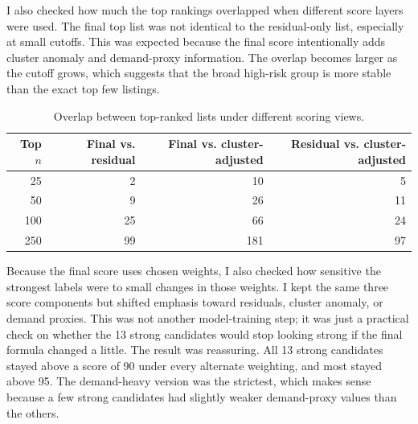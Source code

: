\documentclass[11pt]{article}
\begin{document}
I also checked how much the top rankings overlapped when different score layers were used. The final top list was not identical to the residual-only list, especially at small cutoffs. This was expected because the final score intentionally adds cluster anomaly and demand-proxy information. The overlap becomes larger as the cutoff grows, which suggests that the broad high-risk group is more stable than the exact top few listings.

\begin{table}[H]
\centering
\caption{Overlap between top-ranked lists under different scoring views.}
\small
\begin{tabular}{rrrr}
\toprule
Top $n$ & Final vs. residual & Final vs. cluster-adjusted & Residual vs. cluster-adjusted \\
\midrule
25 & 2 & 10 & 5 \\
50 & 9 & 26 & 11 \\
100 & 25 & 66 & 24 \\
250 & 99 & 181 & 97 \\
\bottomrule
\end{tabular}
\end{table}

Because the final score uses chosen weights, I also checked how sensitive the strongest labels were to small changes in those weights. I kept the same three score components but shifted emphasis toward residuals, cluster anomaly, or demand proxies. This was not another model-training step; it was just a practical check on whether the 13 strong candidates would stop looking strong if the final formula changed a little. The result was reassuring. All 13 strong candidates stayed above a score of 90 under every alternate weighting, and most stayed above 95. The demand-heavy version was the strictest, which makes sense because a few strong candidates had slightly weaker demand-proxy values than the others.

\begin{table}[H]
\centering
\caption{Weight sensitivity check for the 13 strong candidates from the final score.}
\small
{}
\end{table}
\end{document}
